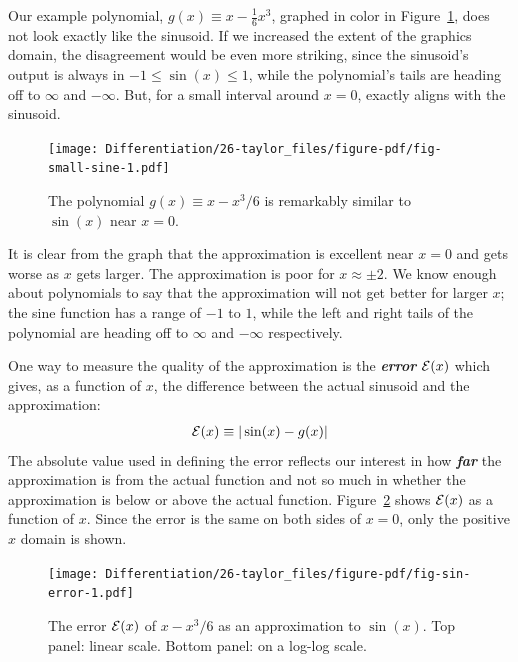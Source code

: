 \documentclass[
  letterpaper,
  DIV=11,
  numbers=noendperiod,
  oneside]{scrreprt}
\begin{document}
Our example polynomial, \(g(x) \equiv x - \frac{1}{6}x^3\), graphed in
color in Figure~\ref{fig-small-sine}, does not look exactly like the
sinusoid. If we increased the extent of the graphics domain, the
disagreement would be even more striking, since the sinusoid's output is
always in \(-1 \leq \sin(x) \leq 1\), while the polynomial's tails are
heading off to \(\infty\) and \(-\infty\). But, for a small interval
around \(x=0\), exactly aligns with the sinusoid.

\begin{figure}

{\centering \texttt{[image: Differentiation/26-taylor\_files/figure-pdf/fig-small-sine-1.pdf]}

}

\caption{\label{fig-small-sine}The polynomial \(g(x) \equiv x -x^3 / 6\)
is remarkably similar to \(\sin(x)\) near \(x=0\).}

\end{figure}

It is clear from the graph that the approximation is excellent near
\(x=0\) and gets worse as \(x\) gets larger. The approximation is poor
for \(x \approx \pm 2\). We know enough about polynomials to say that
the approximation will not get better for larger \(x\); the sine
function has a range of \(-1\) to \(1\), while the left and right tails
of the polynomial are heading off to \(\infty\) and \(-\infty\)
respectively.

One way to measure the quality of the approximation is the
\textbf{\emph{error}} \({\cal E}(x)\) which gives, as a function of
\(x\), the difference between the actual sinusoid and the approximation:
\[{\cal E}(x) \equiv |\strut\sin(x) - g(x)|\] The absolute value used in
defining the error reflects our interest in how \textbf{\emph{far}} the
approximation is from the actual function and not so much in whether the
approximation is below or above the actual function.
Figure~\ref{fig-sin-error} shows \({\cal E}(x)\) as a function of \(x\).
Since the error is the same on both sides of \(x=0\), only the positive
\(x\) domain is shown.

\begin{figure}

{\centering \texttt{[image: Differentiation/26-taylor\_files/figure-pdf/fig-sin-error-1.pdf]}

}

\caption{\label{fig-sin-error}The error \({\cal E}(x)\) of \(x - x^3/6\)
as an approximation to \(\sin(x)\). Top panel: linear scale. Bottom
panel: on a log-log scale.}

\end{figure}
\end{document}
